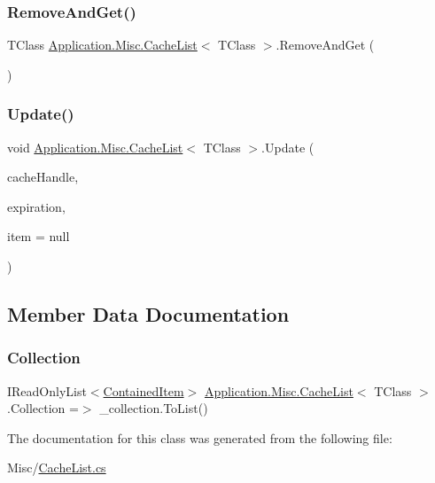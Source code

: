 \subsubsection{\texorpdfstring{Remove\+And\+Get()}{RemoveAndGet()}}
{\footnotesize\ttfamily T\+Class \mbox{\hyperlink{class_application_1_1_misc_1_1_cache_list}{Application.\+Misc.\+Cache\+List}}$<$ T\+Class $>$.Remove\+And\+Get (\begin{DoxyParamCaption}{ }\end{DoxyParamCaption})}

\mbox{\label{class_application_1_1_misc_1_1_cache_list_a7ffcd0d1d2df50cf6e58ad68eaeb670d}} 
\subsubsection{\texorpdfstring{Update()}{Update()}}
{\footnotesize\ttfamily void \mbox{\hyperlink{class_application_1_1_misc_1_1_cache_list}{Application.\+Misc.\+Cache\+List}}$<$ T\+Class $>$.Update (\begin{DoxyParamCaption}\item[{\mbox{\hyperlink{interface_application_1_1_misc_1_1_i_cache_handle}{I\+Cache\+Handle}}}]{cache\+Handle,  }\item[{Date\+Time}]{expiration,  }\item[{T\+Class}]{item = {\ttfamily null} }\end{DoxyParamCaption})}



\subsection{Member Data Documentation}
\mbox{\label{class_application_1_1_misc_1_1_cache_list_a76ecbd816361d086f756cbe086b505e6}} 
\subsubsection{\texorpdfstring{Collection}{Collection}}
{\footnotesize\ttfamily I\+Read\+Only\+List$<$\mbox{\hyperlink{class_application_1_1_misc_1_1_cache_list_1_1_contained_item}{Contained\+Item}}$>$ \mbox{\hyperlink{class_application_1_1_misc_1_1_cache_list}{Application.\+Misc.\+Cache\+List}}$<$ T\+Class $>$.Collection =$>$ \+\_\+collection.\+To\+List()}



The documentation for this class was generated from the following file\+:\begin{DoxyCompactItemize}
\item 
Misc/\mbox{\hyperlink{_cache_list_8cs}{Cache\+List.\+cs}}\end{DoxyCompactItemize}
